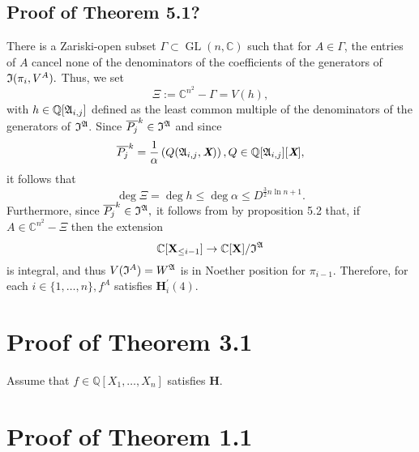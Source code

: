 \documentclass[sigconf]{acmart}
\def\Xb{\textit{\textbf{X}}}
\def\pjb{\overline{P_{j}}}
\DeclareMathOperator{\GL}{GL}
\def\C{\mathbb{C}}
\def\Q{\mathbb{Q}}
\def\I{\frak{I}}
\def\A{\frak{A}}
\begin{document}
\subsection{Proof of Theorem 5.1?}
%
There is a Zariski-open subset $\Gamma \subset \GL(n,\C)$ such that for $A \in \Gamma$, the entries of $A$ cancel none of the denominators of the coefficients of the generators of $\I(\pi_i,V^{A}).$ Thus, we set
\[
\Xi := \C^{n^2} - \Gamma = V(h),
\]
with $h \in \Q[\A_{i,j}]$ defined as the least common multiple of the denominators of the generators of $\I^\A.$ Since $\pjb^k \in \I^\A$ and since
\[
\pjb^k = \frac{1}{\alpha}\left( Q(\A_{i,j},\Xb) \right), Q \in \Q[\A_{i,j}][\Xb],
\]
it follows that 
\[
\deg \Xi = \deg h \leq \deg \alpha \leq D^{\frac{3}{2} n \ln n+1}.
\]
Furthermore, since $\pjb^k \in \I^\A,$ it follows from by proposition 5.2 that, if $A \in \C^{n^2} - \Xi$ then the extension  
\[
\C[\textbf{X}_{\leq i-1}]\rightarrow\C[\textbf{X}]/\frak{I}^\A
\]
is integral, and thus $V(\I^A)=W^\A$ is in Noether position for $\pi_{i-1}.$ Therefore, for each $i \in\{1,\hdots,n\}, f^A$ satisfies $\textbf{H}_i^{'}(4)$.
%
%
%
%
%
%
\section{Proof of Theorem 3.1}
%
Assume that $f\in \Q[X_1,\hdots,X_n]$ satisfies $\textbf{H}.$
%
%
%
%
\section{Proof of Theorem 1.1}
%
%


\end{document}
